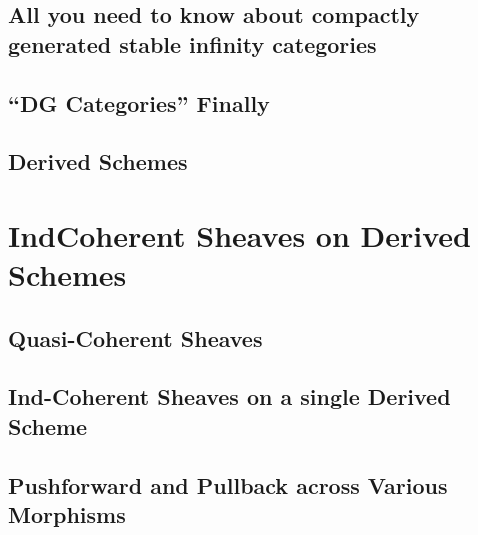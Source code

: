 \documentclass{article}
\begin{document}
  \subsection{
    All you need to know about
    compactly generated stable infinity categories
  }
    

  \subsection{``DG Categories'' Finally}
    

  \subsection{Derived Schemes}

\section{IndCoherent Sheaves on Derived Schemes}\label{indcoh}

  \subsection{Quasi-Coherent Sheaves}



  \subsection{Ind-Coherent Sheaves on a single Derived Scheme}
    

  \subsection{Pushforward and Pullback across Various Morphisms}
    
\end{document}
